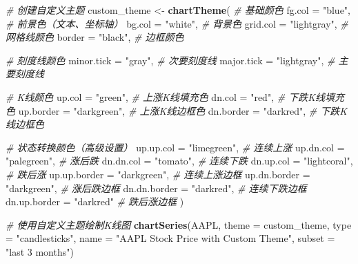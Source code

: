 \documentclass[]{ctexbook}
\newenvironment{Shaded}{\begin{snugshade}}{\end{snugshade}}
\newcommand{\AttributeTok}[1]{\textcolor[rgb]{0.13,0.29,0.53}{#1}}
\newcommand{\CommentTok}[1]{\textcolor[rgb]{0.56,0.35,0.01}{\textit{#1}}}
\newcommand{\FunctionTok}[1]{\textcolor[rgb]{0.13,0.29,0.53}{\textbf{#1}}}
\newcommand{\NormalTok}[1]{#1}
\newcommand{\OtherTok}[1]{\textcolor[rgb]{0.56,0.35,0.01}{#1}}
\newcommand{\StringTok}[1]{\textcolor[rgb]{0.31,0.60,0.02}{#1}}
\begin{document}
\begin{Shaded}
\begin{Highlighting}[]
\CommentTok{\# 创建自定义主题}
\NormalTok{custom\_theme }\OtherTok{\textless{}{-}} \FunctionTok{chartTheme}\NormalTok{(}
  \CommentTok{\# 基础颜色}
  \AttributeTok{fg.col =} \StringTok{"blue"}\NormalTok{,      }\CommentTok{\# 前景色（文本、坐标轴）}
  \AttributeTok{bg.col =} \StringTok{"white"}\NormalTok{,         }\CommentTok{\# 背景色}
  \AttributeTok{grid.col =} \StringTok{"lightgray"}\NormalTok{,   }\CommentTok{\# 网格线颜色}
  \AttributeTok{border =} \StringTok{"black"}\NormalTok{,         }\CommentTok{\# 边框颜色}
  
  \CommentTok{\# 刻度线颜色}
  \AttributeTok{minor.tick =} \StringTok{"gray"}\NormalTok{,      }\CommentTok{\# 次要刻度线}
  \AttributeTok{major.tick =} \StringTok{"lightgray"}\NormalTok{,  }\CommentTok{\# 主要刻度线}
  
  \CommentTok{\# K线颜色}
  \AttributeTok{up.col =} \StringTok{"green"}\NormalTok{,         }\CommentTok{\# 上涨K线填充色}
  \AttributeTok{dn.col =} \StringTok{"red"}\NormalTok{,           }\CommentTok{\# 下跌K线填充色}
  \AttributeTok{up.border =} \StringTok{"darkgreen"}\NormalTok{,  }\CommentTok{\# 上涨K线边框色}
  \AttributeTok{dn.border =} \StringTok{"darkred"}\NormalTok{,    }\CommentTok{\# 下跌K线边框色}
  
  \CommentTok{\# 状态转换颜色（高级设置）}
  \AttributeTok{up.up.col =} \StringTok{"limegreen"}\NormalTok{,    }\CommentTok{\# 连续上涨}
  \AttributeTok{up.dn.col =} \StringTok{"palegreen"}\NormalTok{,    }\CommentTok{\# 涨后跌}
  \AttributeTok{dn.dn.col =} \StringTok{"tomato"}\NormalTok{,       }\CommentTok{\# 连续下跌}
  \AttributeTok{dn.up.col =} \StringTok{"lightcoral"}\NormalTok{,   }\CommentTok{\# 跌后涨}
  \AttributeTok{up.up.border =} \StringTok{"darkgreen"}\NormalTok{, }\CommentTok{\# 连续上涨边框}
  \AttributeTok{up.dn.border =} \StringTok{"darkgreen"}\NormalTok{, }\CommentTok{\# 涨后跌边框}
  \AttributeTok{dn.dn.border =} \StringTok{"darkred"}\NormalTok{,   }\CommentTok{\# 连续下跌边框}
  \AttributeTok{dn.up.border =} \StringTok{"darkred"}    \CommentTok{\# 跌后涨边框}
\NormalTok{)}

\CommentTok{\# 使用自定义主题绘制K线图}
\FunctionTok{chartSeries}\NormalTok{(AAPL, }
            \AttributeTok{theme =}\NormalTok{ custom\_theme, }
            \AttributeTok{type =} \StringTok{"candlesticks"}\NormalTok{, }
            \AttributeTok{name =} \StringTok{"AAPL Stock Price with Custom Theme"}\NormalTok{,}
            \AttributeTok{subset =} \StringTok{"last 3 months"}\NormalTok{)}
\end{Highlighting}
\end{Shaded}
\end{document}
